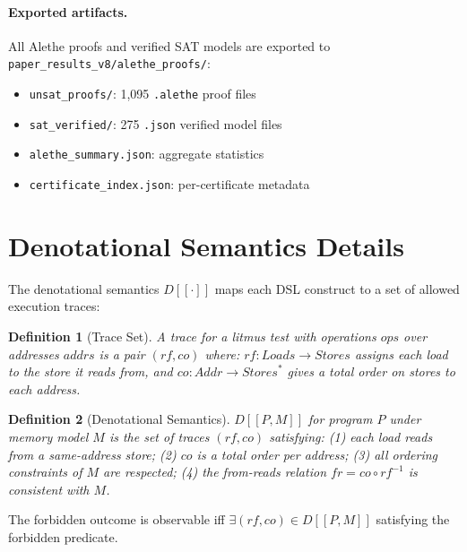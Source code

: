\documentclass[11pt]{article}
\newtheorem{definition}{Definition}
\begin{document}
\paragraph{Exported artifacts.}
All Alethe proofs and verified SAT models are exported to
\texttt{paper\_results\_v8/alethe\_proofs/}:
\begin{itemize}[nosep]
\item \texttt{unsat\_proofs/}: 1{,}095 \texttt{.alethe} proof files
\item \texttt{sat\_verified/}: 275 \texttt{.json} verified model files
\item \texttt{alethe\_summary.json}: aggregate statistics
\item \texttt{certificate\_index.json}: per-certificate metadata
\end{itemize}

\section{Denotational Semantics Details}
\label{app:denotational-details}

The denotational semantics $D[\![\cdot]\!]$ maps each DSL construct
to a set of allowed execution traces:

\begin{definition}[Trace Set]
A \emph{trace} for a litmus test with operations $\mathit{ops}$
over addresses $\mathit{addrs}$ is a pair $(\mathit{rf}, \mathit{co})$ where:
$\mathit{rf}: \mathit{Loads} \to \mathit{Stores}$ assigns each load
to the store it reads from, and
$\mathit{co}: \mathit{Addr} \to \mathit{Stores}^*$ gives a total
order on stores to each address.
\end{definition}

\begin{definition}[Denotational Semantics]
$D[\![P, M]\!]$ for program $P$ under memory model $M$ is the set
of traces $(\mathit{rf}, \mathit{co})$ satisfying:
(1) each load reads from a same-address store;
(2) $\mathit{co}$ is a total order per address;
(3) all ordering constraints of $M$ are respected;
(4) the from-reads relation $\mathit{fr} = \mathit{co} \circ \mathit{rf}^{-1}$
is consistent with $M$.
\end{definition}

The forbidden outcome is observable iff $\exists (\mathit{rf}, \mathit{co})
\in D[\![P, M]\!]$ satisfying the forbidden predicate.
\end{document}
